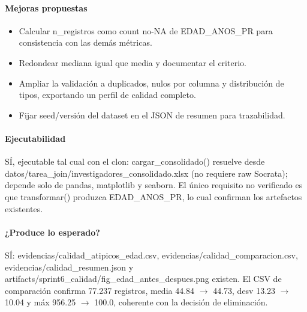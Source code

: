 \paragraph{Mejoras propuestas}
\begin{itemize}
  \item Calcular n\_registros como count no-NA de EDAD\_ANOS\_PR para consistencia con las demás métricas.
  \item Redondear mediana igual que media y documentar el criterio.
  \item Ampliar la validación a duplicados, nulos por columna y distribución de tipos, exportando un perfil de calidad completo.
  \item Fijar seed/versión del dataset en el JSON de resumen para trazabilidad.
\end{itemize}

\paragraph{Ejecutabilidad}
SÍ, ejecutable tal cual con el clon: cargar\_consolidado() resuelve desde datos/tarea\_join/investigadores\_consolidado.xlsx (no requiere raw Socrata); depende solo de pandas, matplotlib y seaborn. El único requisito no verificado es que transformar() produzca EDAD\_ANOS\_PR, lo cual confirman los artefactos existentes.

\paragraph{¿Produce lo esperado?}
SÍ: evidencias/calidad\_atipicos\_edad.csv, evidencias/calidad\_comparacion.csv, evidencias/calidad\_resumen.json y artifacts/sprint6\_calidad/fig\_edad\_antes\_despues.png existen. El CSV de comparación confirma 77.237 registros, media 44.84 $\rightarrow$ 44.73, desv 13.23 $\rightarrow$ 10.04 y máx 956.25 $\rightarrow$ 100.0, coherente con la decisión de eliminación.


